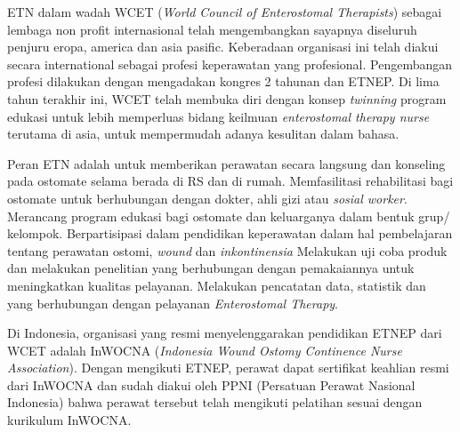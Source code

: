 \begin{enumerate}
ETN dalam wadah WCET (\textit{World Council of Enterostomal Therapists}) sebagai lembaga non profit internasional telah mengembangkan sayapnya diseluruh penjuru eropa, america dan asia pasific. Keberadaan organisasi ini telah diakui secara international sebagai profesi keperawatan yang profesional. Pengembangan profesi dilakukan dengan mengadakan kongres 2 tahunan dan ETNEP. Di lima tahun terakhir ini, WCET telah membuka diri dengan konsep \textit{twinning} program edukasi untuk lebih memperluas bidang keilmuan \textit{enterostomal therapy nurse} terutama di asia, untuk mempermudah adanya kesulitan dalam bahasa.

Peran ETN adalah untuk memberikan perawatan secara langsung dan konseling pada ostomate selama berada di RS dan di rumah. Memfasilitasi rehabilitasi bagi ostomate untuk berhubungan dengan dokter, ahli gizi atau \textit{sosial worker}. Merancang program edukasi bagi ostomate dan keluarganya dalam bentuk grup/ kelompok. Berpartisipasi dalam pendidikan keperawatan dalam hal pembelajaran tentang perawatan ostomi, \textit{wound} dan \textit{inkontinensia} Melakukan uji coba produk dan melakukan penelitian yang berhubungan dengan pemakaiannya untuk meningkatkan kualitas pelayanan. Melakukan pencatatan data, statistik dan yang berhubungan dengan pelayanan \textit{Enterostomal Therapy}.

Di Indonesia, organisasi yang resmi menyelenggarakan pendidikan ETNEP dari WCET adalah InWOCNA (\textit{Indonesia Wound Ostomy Continence Nurse Association}). Dengan mengikuti ETNEP, perawat dapat sertifikat keahlian resmi dari InWOCNA dan sudah diakui oleh PPNI (Persatuan Perawat Nasional Indonesia) bahwa perawat tersebut telah mengikuti pelatihan sesuai dengan kurikulum InWOCNA. \citep{inwocna}

\end{enumerate}
